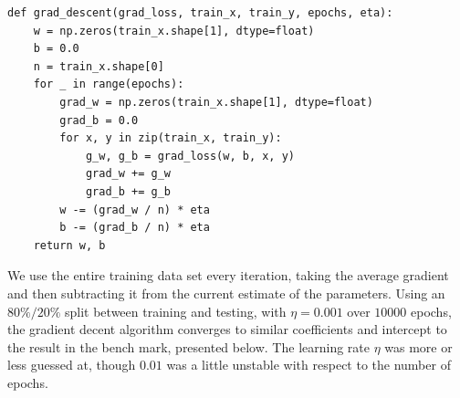 \documentclass{article} %
\begin{document}
\begin{verbatim}
def grad_descent(grad_loss, train_x, train_y, epochs, eta):
    w = np.zeros(train_x.shape[1], dtype=float)
    b = 0.0
    n = train_x.shape[0]
    for _ in range(epochs):
        grad_w = np.zeros(train_x.shape[1], dtype=float)
        grad_b = 0.0
        for x, y in zip(train_x, train_y):
            g_w, g_b = grad_loss(w, b, x, y)
            grad_w += g_w
            grad_b += g_b
        w -= (grad_w / n) * eta
        b -= (grad_b / n) * eta
    return w, b
\end{verbatim}

We use the entire training data set every iteration, taking the
average gradient and then subtracting it from the current estimate of
the parameters. Using an $80\%/20\%$ split between training and
testing, with $\eta = 0.001$ over $10000$ epochs, the gradient
decent algorithm converges to similar coefficients and intercept to
the result in the bench mark, presented below. The learning rate
$\eta$ was more or less guessed at, though $0.01$ was a little
unstable with respect to the number of epochs.
\end{document}
